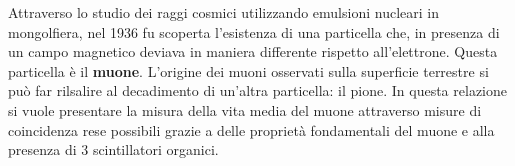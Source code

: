 Attraverso lo studio dei raggi cosmici utilizzando emulsioni nucleari in mongolfiera, nel 1936 fu scoperta l'esistenza di una particella che, in presenza di un campo magnetico deviava in maniera differente rispetto all'elettrone. Questa particella è il \textbf{muone}. L'origine dei muoni osservati sulla superficie terrestre si può far rilsalire al decadimento di un'altra particella: il pione. In questa relazione si vuole presentare la misura della vita media del muone attraverso misure di coincidenza rese possibili grazie a delle proprietà fondamentali del muone e alla presenza di 3 scintillatori organici. 